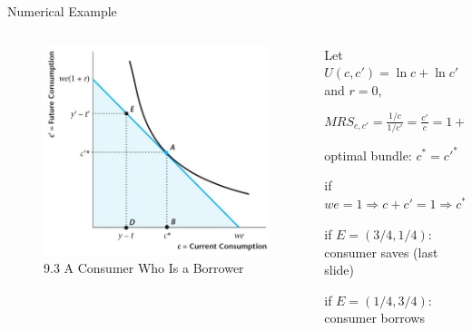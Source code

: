 \documentclass[11pt,aspectratio=169,usenames,dvipsnames]{beamer}
\let\tempone\itemize
\let\temptwo\enditemize
\renewenvironment{itemize}{\tempone\addtolength{\itemsep}{\fill}}{\temptwo}
\begin{document}
\begin{frame}{Numerical Example}
\label{slide:Numerical_Example}
    \begin{columns}
        \begin{column}{0.5\textwidth}
            \begin{figure}
                \caption{\scriptsize 9.3 A Consumer Who Is a Borrower}
                \includegraphics[width=.9\textwidth]{./figures/Figure9_3_2.jpg}
            \end{figure}
        \end{column}
        \begin{column}{0.5\textwidth}
            Let $ U( c, c' ) = \ln c + \ln c' $ and $ r = 0 $,

            $ \displaystyle MRS_{c, c'} = \frac{1/c}{1/c'} = \frac{c'}{c} = 1+r = 1 $

            optimal bundle: $ c^{*} = c'^{*} $
            \begin{itemize}
                \item if $ we = 1 \Rightarrow c + c' = 1 \Rightarrow c^{*} = c'^{*} = \frac{1}{2}$
                \item if $ E = ( 3/4, 1/4 ) $: consumer saves (last slide)
                \item if $ E = ( 1/4, 3/4 ) $: consumer borrows
            \end{itemize}
        \end{column}
    \end{columns}
\end{frame}
\end{document}
